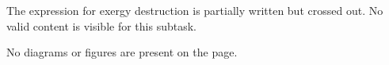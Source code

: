 The expression for exergy destruction is partially written but crossed out. No valid content is visible for this subtask.  

No diagrams or figures are present on the page.